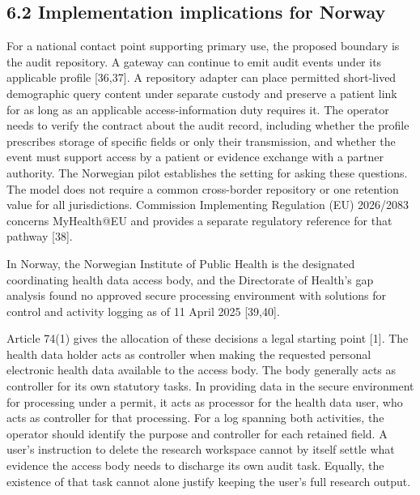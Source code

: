 \documentclass[5p,twocolumn]{elsarticle}
\begin{document}
\hypertarget{implementation-implications-for-norway}{%
\subsection{6.2 Implementation implications for
Norway}\label{implementation-implications-for-norway}}

For a national contact point supporting primary use, the proposed
boundary is the audit repository. A gateway can continue to emit audit
events under its applicable profile {[}36,37{]}. A repository adapter
can place permitted short-lived demographic query content under separate
custody and preserve a patient link for as long as an applicable
access-information duty requires it. The operator needs to verify the
contract about the audit record, including whether the profile
prescribes storage of specific fields or only their transmission, and
whether the event must support access by a patient or evidence exchange
with a partner authority. The Norwegian pilot establishes the setting
for asking these questions. The model does not require a common
cross-border repository or one retention value for all jurisdictions.
Commission Implementing Regulation (EU) 2026/2083 concerns MyHealth@EU
and provides a separate regulatory reference for that pathway {[}38{]}.

In Norway, the Norwegian Institute of Public Health is the designated
coordinating health data access body, and the Directorate of Health's
gap analysis found no approved secure processing environment with
solutions for control and activity logging as of 11 April 2025
{[}39,40{]}.

Article 74(1) gives the allocation of these decisions a legal starting
point {[}1{]}. The health data holder acts as controller when making the
requested personal electronic health data available to the access body.
The body generally acts as controller for its own statutory tasks. In
providing data in the secure environment for processing under a permit,
it acts as processor for the health data user, who acts as controller
for that processing. For a log spanning both activities, the operator
should identify the purpose and controller for each retained field. A
user's instruction to delete the research workspace cannot by itself
settle what evidence the access body needs to discharge its own audit
task. Equally, the existence of that task cannot alone justify keeping
the user's full research output.
\end{document}
